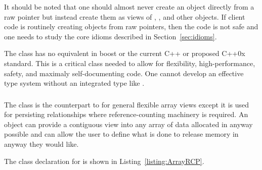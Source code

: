 \documentclass[pdf,ps2pdf,11pt]{SANDreport}
\begin{document}
It should be noted that one should almost never create an {}
object directly from a raw pointer but instead create them as views of
{}, {}, {} and other {}
objects.  If client code is routinely creating {} objects from
raw pointers, then the code is not safe and one needs to study the core idioms
described in Section~\ref{sec:idioms}.

The class {} has no equivalent in boost or the current
C++ or proposed C++0x standard.  This is a critical class needed to
allow for flexibility, high-performance, safety, and maximaly
self-documenting code.  One cannot develop an effective type system
without an integrated type like {}.


%
{}\subsubsection{}
\label{sec:ArrayRCP}
%

The class {} is the counterpart to {} for general
flexible array views except it is used for persisting relationships where
reference-counting machinery is required.  An {} object can
provide a contiguous view into any array of data allocated in anyway possible
and can allow the user to define what is done to release memory in anyway they
would like.

The class declaration for {} is shown in
Listing~\ref{listing:ArrayRCP}.
\end{document}

